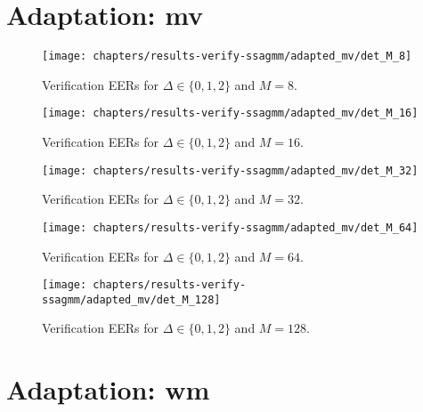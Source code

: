 \newpage
\section{Adaptation: mv}



\begin{figure}[ht]
	\centering
	\texttt{[image: chapters/results-verify-ssagmm/adapted\_mv/det\_M\_8]}
	\caption{Verification EERs for $\Delta \in \{0, 1, 2\}$ and $M = 8$.}
	\label{fig:results-verify-ssagmm_M_8}
\end{figure}

\newpage


\begin{figure}[ht]
	\centering
	\texttt{[image: chapters/results-verify-ssagmm/adapted\_mv/det\_M\_16]}
	\caption{Verification EERs for $\Delta \in \{0, 1, 2\}$ and $M = 16$.}
	\label{fig:results-verify-ssagmm_M_16}
\end{figure}

\newpage


\begin{figure}[ht]
	\centering
	\texttt{[image: chapters/results-verify-ssagmm/adapted\_mv/det\_M\_32]}
	\caption{Verification EERs for $\Delta \in \{0, 1, 2\}$ and $M = 32$.}
	\label{fig:results-verify-ssagmm_M_32}
\end{figure}

\newpage


\begin{figure}[ht]
	\centering
	\texttt{[image: chapters/results-verify-ssagmm/adapted\_mv/det\_M\_64]}
	\caption{Verification EERs for $\Delta \in \{0, 1, 2\}$ and $M = 64$.}
	\label{fig:results-verify-ssagmm_M_64}
\end{figure}

\newpage


\begin{figure}[ht]
	\centering
	\texttt{[image: chapters/results-verify-ssagmm/adapted\_mv/det\_M\_128]}
	\caption{Verification EERs for $\Delta \in \{0, 1, 2\}$ and $M = 128$.}
	\label{fig:results-verify-ssagmm_M_128}
\end{figure}

\newpage
\section{Adaptation: wm}

